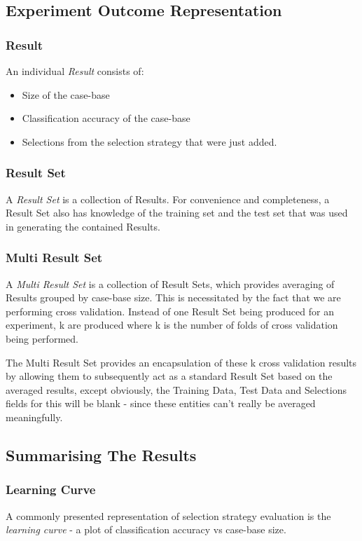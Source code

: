 \documentclass[a4paper,11pt]{report}
\begin{document}
\subsection{Experiment Outcome Representation}
\subsubsection{Result}
An individual \emph{Result} consists of:
\begin{itemize}
	\item Size of the case-base
	\item Classification accuracy of the case-base
	\item Selections from the selection strategy that were just added.
\end{itemize}

\subsubsection{Result Set}
A \emph{Result Set} is a collection of Results. For convenience and completeness, a Result Set also has knowledge of the training set and the test set that was used in generating the contained Results.

\subsubsection{Multi Result Set}
A \emph{Multi Result Set} is a collection of Result Sets, which provides averaging of Results grouped by case-base size. This is necessitated by the fact that we are performing cross validation. Instead of one Result Set being produced for an experiment, k are produced where k is the number of folds of cross validation being performed.

The Multi Result Set provides an encapsulation of these k cross validation results by allowing them to subsequently act as a standard Result Set based on the averaged results, except obviously, the Training Data, Test Data and Selections fields for this will be blank - since these entities can't really be averaged meaningfully.

\subsection{Summarising The Results}
\subsubsection{Learning Curve}\label{sec:multiresultset}
A commonly presented representation of selection strategy evaluation is the \emph{learning curve} - a plot of classification accuracy vs case-base size.
\end{document}
